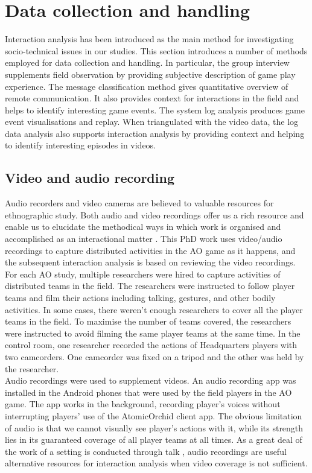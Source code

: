 \section{Data collection and handling}\label{sec:methdatahandling}
Interaction analysis has been introduced as the main method for investigating socio-technical issues in our studies. This section introduces a number of methods employed for data collection and handling. In particular, the group interview supplements field observation by providing subjective description of game play experience. The message classification method gives quantitative overview of remote communication. It also provides context for interactions in the field and helps to identify interesting game events. The system log analysis produces game event visualisations and replay. When triangulated with the video data, the log data analysis also supports interaction analysis by providing context and helping to identify interesting episodes in videos.\\

\subsection{Video and audio recording}
Audio recorders and video cameras are believed to valuable resources for ethnographic study. Both audio and video recordings offer us a rich resource and enable us to elucidate the methodical ways in which work is organised and accomplished as an interactional matter \citep{Crabtree2012}. This PhD work uses video/audio recordings to capture distributed activities in the \acf{AO} game as it happens, and the subsequent interaction analysis is based on reviewing the video recordings. \\

For each \ac{AO} study, multiple researchers were hired to capture activities of distributed teams in the field. The researchers were instructed to follow player teams and film their actions including talking, gestures, and other bodily activities. In some cases, there weren't enough researchers to cover all the player teams in the field. To maximise the number of teams covered, the researchers were instructed to avoid filming the same player teams at the same time. In the control room, one researcher recorded the actions of Headquarters players with two camcorders. One camcorder was fixed on a tripod and the other was held by the researcher. \\

Audio recordings were used to supplement videos. An audio recording app was installed in the Android phones that were used by the field players in the \ac{AO} game. The app works in the background, recording player's voices without interrupting players' use of the AtomicOrchid client app. The obvious limitation of audio is that we cannot visually see player's actions with it, while its strength lies in its guaranteed coverage of all player teams at all times. As a great deal of the work of a setting is conducted through talk \citep{Crabtree2012}, audio recordings are useful alternative resources for interaction analysis when video coverage is not sufficient. \\


